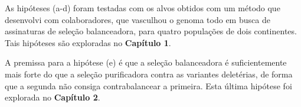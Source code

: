 \begin{refsection}

As hipóteses (a-d) foram testadas com os alvos obtidos com um método que desenvolvi com colaboradores, que vasculhou o genoma todo em busca de assinaturas de seleção balanceadora, para quatro populações de dois continentes. Tais hipóteses são exploradas no \textbf{Capítulo 1}. 


	A premissa para a hipótese (e) é que a seleção balanceadora é suficientemente mais forte do que a seleção purificadora contra as variantes deletérias, de forma que a segunda não consiga contrabalancear a primeira. Esta última hipótese foi explorada no \textbf{Capítulo 2}.
    

%
%
%




\end{refsection}
